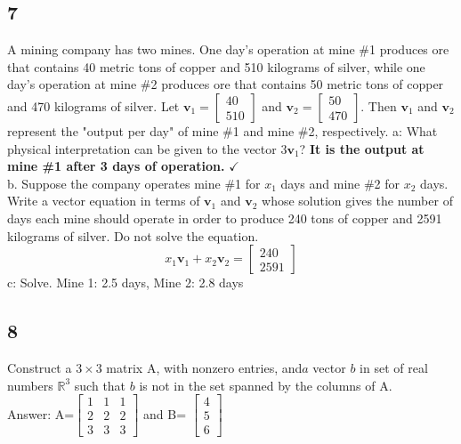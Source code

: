 \documentclass{article}
\begin{document}
\subsection*{7}
A mining company has two mines. One day's operation at mine \#1 produces ore that contains 40 metric tons of copper and 510 kilograms of silver, 
while one day's operation at mine \#2 produces ore that contains 50 metric tons of copper and 470 kilograms of silver. 
Let \( \mathbf{v}_1 = \begin{bmatrix} 40 \\ 510 \end{bmatrix} \) and \( \mathbf{v}_2 = \begin{bmatrix} 50 \\ 470 \end{bmatrix} \).
Then \( \mathbf{v}_1 \) and \( \mathbf{v}_2 \) represent the "output per day" of mine \#1 and mine \#2, respectively.
a: What physical interpretation can be given to the vector \( 3\mathbf{v}_1 \)?
\textbf{It is the output at mine \#1 after 3 days of operation.} \(\checkmark\)
\\b. Suppose the company operates mine \#1 for \( x_1 \) days and mine \#2 for \( x_2 \) days. Write a vector equation in terms of \( \mathbf{v}_1 \) and \( \mathbf{v}_2 \) whose solution gives the number of days each mine should operate in order to produce 240 tons of copper and 2591 kilograms of silver. Do not solve the equation.
\[x_1 \mathbf{v}_1 + x_2 \mathbf{v}_2 = \begin{bmatrix} 240 \\ 2591 
\end{bmatrix}
\]
c: Solve.
Mine 1: 2.5 days, Mine 2: 2.8 days


\subsection*{8}
Construct a $3\times3$ matrix A, with nonzero entries, and$ a$ vector $b$ in set of real numbers $\mathbb{R}^3$ such that $b$ is not in the set spanned by the columns of A.
\\Answer: A=$
\left[\begin{array}{ccc}
    1&1&1\\2&2&2\\3&3&3
\end{array}\right]$ and B= $\left[\begin{array}{c}
    4\\5\\6
\end{array}\right]$
\end{document}
